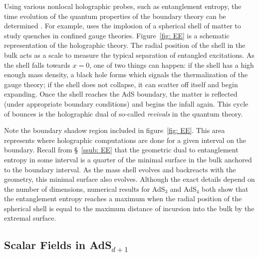 \documentclass[../PhD.tex]{subfiles}
\begin{document}
Using various nonlocal holographic probes, such as entanglement entropy, the time evolution of the quantum properties of the boundary theory can be determined \cite{1410.6201}. For example, \cite{1412.6002} uses the implosion of a spherical shell of matter to study quenches in confined gauge theories. Figure~\ref{fig: EE} is a schematic representation of the holographic theory. The radial position of the shell in the bulk acts as a scale to measure the typical separation of entangled excitations. As the shell falls towards $x = 0$, one of two things can happen: if the shell has a high enough mass density, a black hole forms which signals the thermalization of the gauge theory; if the shell does not collapse, it can scatter off itself and begin expanding. Once the shell reaches the AdS boundary, the matter is reflected (under appropriate boundary conditions) and begins the infall again. This cycle of bounces is the holographic dual of so-called \emph{revivals} in the quantum theory.

Note the boundary shadow region included in figure~\ref{fig: EE}. This area represents where holographic computations are done for a given interval on the boundary. Recall from \S~\!\ref{ssub: EE} that the geometric dual to entanglement entropy in some interval is a quarter of the minimal surface in the bulk anchored to the boundary interval. As the mass shell evolves and backreacts with the geometry, this minimal surface also evolves. Although the exact details depend on the number of dimensions, numerical results for AdS$_3$ and AdS$_4$ both show that the entanglement entropy reaches a maximum when the radial position of the spherical shell is equal to the maximum distance of incursion into the bulk by the extremal surface.


\subsection{Scalar Fields in AdS$_{d+1}$}
\end{document}
